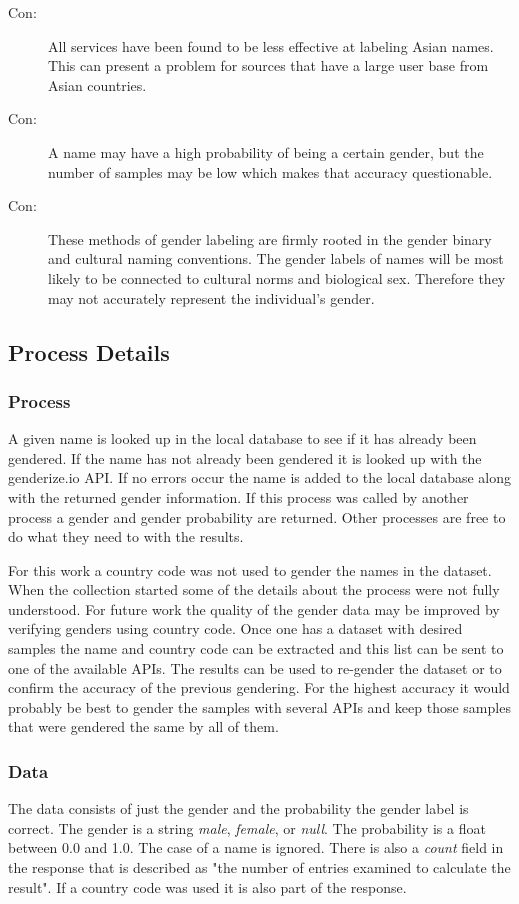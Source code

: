 \documentclass[12pt]{article}
\begin{document}
\begin{description}
    \item [Con:] All services have been found to be less effective at labeling Asian names\cite{Santamaria2018}. This can present a problem for sources that have a large user base from Asian countries.

    \item [Con:] A name may have a high probability of being a certain gender, but the number of samples may be low which makes that accuracy questionable.
    
    \item [Con:] These methods of gender labeling are firmly rooted in the gender binary and cultural naming conventions. The gender labels of names will be most likely to be connected to cultural norms and biological sex. Therefore they may not accurately represent the individual's gender.
\end{description}


\subsection{Process Details}
\subsubsection*{Process}
A given name is looked up in the local database to see if it has already been gendered. If the name has not already been gendered it is looked up with the genderize.io API. If no errors occur the name is added to the local database along with the returned gender information. If this process was called by another process a gender and gender probability are returned. Other processes are free to do what they need to with the results.

For this work a country code was not used to gender the names in the dataset. When the collection started some of the details about the process were not fully understood. For future work the quality of the gender data may be improved by verifying genders using country code. Once one has a dataset with desired samples the name and country code can be extracted and this list can be sent to one of the available APIs. The results can be used to re-gender the dataset or to confirm the accuracy of the previous gendering. For the highest accuracy it would probably be best to gender the samples with several APIs and keep those samples that were gendered the same by all of them.

\subsubsection*{Data}
The data consists of just the gender and the probability the gender label is correct. The gender is a string \textit{male}, \textit{female}, or \textit{null}. The probability is a float between 0.0 and 1.0. The case of a name is ignored. There is also a \textit{count} field in the response that is described as "the number of entries examined to calculate the result"\cite{WEBSITE:GENDER1}. If a country code was used it is also part of the response.
\end{document}
